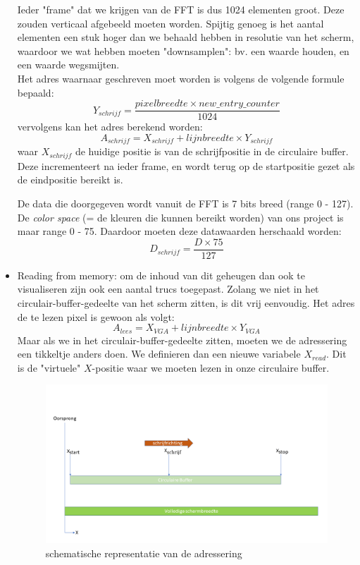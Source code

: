 \documentclass[a4paper,kul]{kulakarticle} %
\begin{document}
\begin{itemize}
	Ieder "frame" dat we krijgen van de FFT is dus 1024 elementen groot. Deze zouden verticaal afgebeeld moeten worden. Spijtig genoeg is het aantal elementen een stuk hoger dan we behaald hebben in resolutie van het scherm, waardoor we wat hebben moeten "downsamplen": bv. een waarde houden, en een waarde wegsmijten.\\
	
	Het adres waarnaar geschreven moet worden is volgens de volgende formule bepaald:
	$$Y_{schrijf} = \frac{pixelbreedte \times new\_entry\_counter }{1024} $$
	vervolgens kan het adres berekend worden:
	$$ A_{schrijf} = X_{schrijf} + lijnbreedte \times Y_{schrijf} $$
	waar $X_{schrijf}$ de huidige positie is van de schrijfpositie in de circulaire buffer. Deze incrementeert na ieder frame, en wordt terug op de startpositie gezet als de eindpositie bereikt is.
	
	De data die doorgegeven wordt vanuit de FFT is 7 bits breed (range 0 - 127). De \textit{color space} (= de kleuren die kunnen bereikt worden) van ons project is maar range 0 - 75. Daardoor moeten deze datawaarden herschaald worden:
	$$D_{schrijf} = \frac{D \times 75}{127}$$
	
	\item Reading from memory: om de inhoud van dit geheugen dan ook te visualiseren zijn ook een aantal trucs toegepast. Zolang we niet in het circulair-buffer-gedeelte van het scherm zitten, is dit vrij eenvoudig. Het adres de te lezen pixel is gewoon als volgt: 
	$$ A_{lees} = X_{VGA} + lijnbreedte \times Y_{VGA} $$
	Maar als we in het circulair-buffer-gedeelte zitten, moeten we de adressering een tikkeltje anders doen. We definieren dan een nieuwe variabele $X_{read}$. Dit is de "virtuele" $X$-positie waar we moeten lezen in onze circulaire buffer.


\begin{figure}[H]
	\centering
	\includegraphics[width=0.7\linewidth]{leesAdressering.png}
	\caption{schematische representatie van de adressering}
	\label{fig:leesAdressering}
\end{figure}


\end{itemize}
\end{document}
